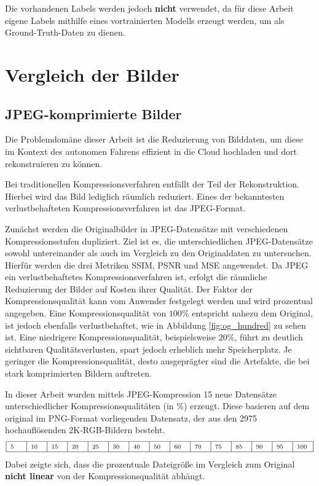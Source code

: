             Die vorhandenen Labels werden jedoch \textbf{nicht} verwendet, da für diese Arbeit eigene Labels mithilfe eines vortrainierten Modells erzeugt werden, um als Ground-Truth-Daten zu dienen.

\newpage 
    \section{Vergleich der Bilder}
        \subsection{JPEG-komprimierte Bilder}
            Die Problemdomäne dieser Arbeit ist die Reduzierung von Bilddaten, um diese im Kontext des autonomen Fahrens effizient in die Cloud hochladen und dort rekonstruieren zu können.

            Bei traditionellen Kompressionsverfahren entfällt der Teil der Rekonstruktion. Hierbei wird das Bild lediglich räumlich reduziert. Eines der bekanntesten verlustbehafteten Kompressionsverfahren ist das JPEG-Format. 
        
            Zunächst werden die Originalbilder in JPEG-Datensätze mit verschiedenen\\
            Kompressionsstufen dupliziert. Ziel ist es, die unterschiedlichen JPEG-Datensätze sowohl untereinander als auch im Vergleich zu den Originaldaten zu untersuchen. Hierfür werden die drei Metriken SSIM, PSNR und MSE angewendet. Da JPEG ein verlustbehaftetes Kompressionsverfahren ist, erfolgt die räumliche Reduzierung der Bilder auf Kosten ihrer Qualität.
            Der Faktor der Kompressionsqualität kann vom Anwender festgelegt werden und wird prozentual angegeben.
            Eine Kompressionsqualität von $100\%$ entspricht nahezu dem Original, ist jedoch ebenfalls verlustbehaftet, wie in Abbildung \ref{fig:og_hundred} zu sehen ist.
            Eine niedrigere Kompressionsqualität, beispielsweise $20\%$, führt zu deutlich sichtbaren Qualitätsverlusten, spart jedoch erheblich mehr Speicherplatz. Je geringer die Kompressionsqualität, desto ausgeprägter sind die Artefakte, die bei stark komprimierten Bildern auftreten.
               
            In dieser Arbeit wurden mittels JPEG-Kompression 15 neue Datensätze unterschiedlicher Kompressionsqualitäten (in \%) erzeugt. Diese basieren auf dem original im PNG-Format vorliegenden Datensatz, der aus den 2975 hochauflösenden
            2K-RGB-Bildern besteht.\newline
            \[
            \begin{array}{|p{0.5cm}|p{0.5cm}|p{0.5cm}|p{0.5cm}|p{0.5cm}|p{0.5cm}|p{0.5cm}|p{0.5cm}|p{0.5cm}|p{0.5cm}|p{0.5cm}|p{0.5cm}|p{0.5cm}|p{0.5cm}|p{0.5cm}|} \hline \scriptsize 5 & \scriptsize 10 & \scriptsize 15 & \scriptsize 20 & \scriptsize 25 & \scriptsize 30 & \scriptsize 40 & \scriptsize 50 & \scriptsize 60 & \scriptsize 70 & \scriptsize 75 & \scriptsize 85 & \scriptsize 90 & \scriptsize 95 & \scriptsize 100 \\ \hline \end{array}
            \]
            Dabei zeigte sich, dass die prozentuale Dateigröße im Vergleich zum Original \textbf{nicht linear} von der Kompressionsqualität abhängt.

